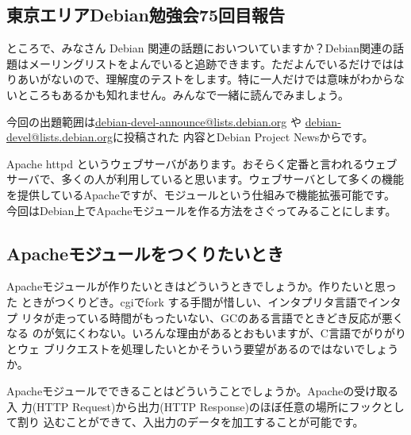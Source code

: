\documentclass[mingoth,a4paper]{jsarticle}
\begin{document}
\subsection{東京エリアDebian勉強会75回目報告}





ところで、みなさん Debian 関連の話題においついていますか？Debian関連の話
題はメーリングリストをよんでいると追跡できます。ただよんでいるだけではは
りあいがないので、理解度のテストをします。特に一人だけでは意味がわからな
いところもあるかも知れません。みんなで一緒に読んでみましょう。

今回の出題範囲は\url{debian-devel-announce@lists.debian.org} や \url{debian-devel@lists.debian.org}に投稿された
内容とDebian Project Newsからです。

\begin{multicols}{2}
% 
\end{multicols}


Apache httpd というウェブサーバがあります。おそらく定番と言われるウェブ
サーバで、多くの人が利用していると思います。ウェブサーバとして多くの機能
を提供しているApacheですが、モジュールという仕組みで機能拡張可能です。
今回はDebian上でApacheモジュールを作る方法をさぐってみることにします。

\subsection{Apacheモジュールをつくりたいとき}

Apacheモジュールが作りたいときはどういうときでしょうか。作りたいと思った
ときがつくりどき。cgiでfork する手間が惜しい、インタプリタ言語でインタプ
リタが走っている時間がもったいない、GCのある言語でときどき反応が悪くなる
のが気にくわない。いろんな理由があるとおもいますが、C言語でがりがりとウェ
ブリクエストを処理したいとかそういう要望があるのではないでしょうか。

Apacheモジュールでできることはどういうことでしょうか。Apacheの受け取る入
力(HTTP Request)から出力(HTTP Response)のほぼ任意の場所にフックとして割り
込むことができて、入出力のデータを加工することが可能です。
\end{document}
